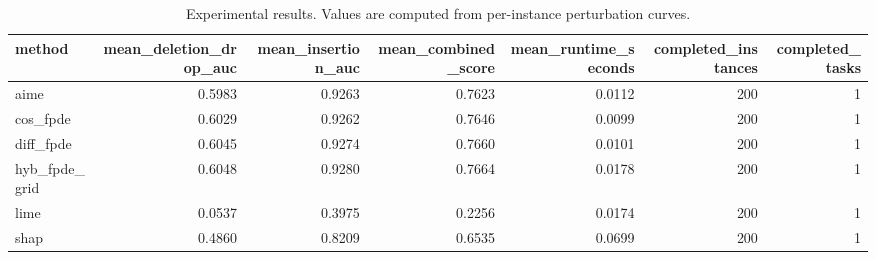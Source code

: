 \begin{table}[t]
\caption{Experimental results. Values are computed from per-instance perturbation curves.}
\label{tab:main_results_computed}
\centering
\begin{tabular}{lrrrrrr}
\toprule
method & mean\_deletion\_drop\_auc & mean\_insertion\_auc & mean\_combined\_score & mean\_runtime\_seconds & completed\_instances & completed\_tasks \\
\midrule
aime & 0.5983 & 0.9263 & 0.7623 & 0.0112 & 200 & 1 \\
cos\_fpde & 0.6029 & 0.9262 & 0.7646 & 0.0099 & 200 & 1 \\
diff\_fpde & 0.6045 & 0.9274 & 0.7660 & 0.0101 & 200 & 1 \\
hyb\_fpde\_grid & 0.6048 & 0.9280 & 0.7664 & 0.0178 & 200 & 1 \\
lime & 0.0537 & 0.3975 & 0.2256 & 0.0174 & 200 & 1 \\
shap & 0.4860 & 0.8209 & 0.6535 & 0.0699 & 200 & 1 \\
\bottomrule
\end{tabular}

\end{table}
